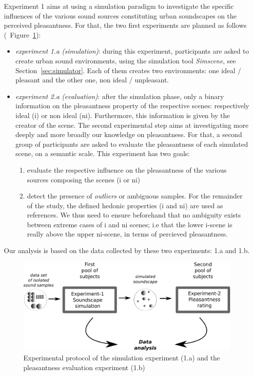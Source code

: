 \documentclass[twoside,twocolumn]{article}
\begin{document}
Experiment 1 aims at using a simulation paradigm to investigate the specific influences of the various sound sources constituting urban soundscapes on the perceived pleasantness. For that, the two first experiments are planned as follows (\cf~Figure~\ref{fig:xp1_2}):
\begin{itemize}
\item \emph{experiment 1.a (simulation)}: during this experiment, participants are asked to create urban sound environments, using the simulation tool \emph{Simscene}, see Section~\ref{sec:simulator}. Each of them creates two environments: one ideal / pleasant and the other one, non ideal / unpleasant.
\item \emph{experiment 2.a (evaluation)}: after the simulation phase, only a binary information on the pleasantness property of the respective scenes: respectively ideal (i) or non ideal (ni). Furthermore, this information is given by the creator of the scene. The second experimental step aims at investigating more deeply and more broadly our knowledge on pleasantness. For that, a second group of participants are asked to evaluate the pleasantness of each simulated scene, on a semantic scale. This experiment has two goals:
\begin{enumerate}
\item evaluate the respective influence on the pleasantness of the various sources composing the scenes (i or ni)
\item detect the presence of \emph{outliers} or ambiguous samples. For the remainder of the study, the defined hedonic properties (i and ni) are used as references. We thus need to ensure beforehand that no ambiguity exists between extreme cases of i and ni scenes; i.e that the lower i-scene is really above the upper ni-scene,  in terms of percieved pleasantness.
\end{enumerate}
\end{itemize}

Our analysis is based on the data collected by these two experiments: 1.a and 1.b.

\begin{figure}[t]
        \myfloatalign
        \includegraphics[width=\linewidth]{gfx/ch_5/5.png}
        \caption{Experimental protocol of the simulation experiment (1.a) and the pleasantness evaluation experiment (1.b)}\label{fig:xp1_2}
\end{figure}
\end{document}
